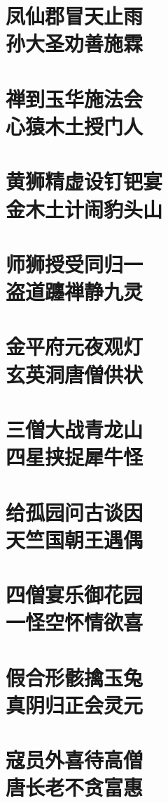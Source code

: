 \documentclass[a4paper,12pt,UTF8,twoside]{ctexbook}
\begin{document}
\chapter[凤仙郡冒天止雨\ 孙大圣劝善施霖]{凤仙郡冒天止雨\\孙大圣劝善施霖}
\chapter[禅到玉华施法会\ 心猿木土授门人]{禅到玉华施法会\\心猿木土授门人}
\chapter[黄狮精虚设钉钯宴\ 金木土计闹豹头山]{黄狮精虚设钉钯宴\\金木土计闹豹头山}
\chapter[师狮授受同归一\ 盗道躔禅静九灵]{师狮授受同归一\\盗道躔禅静九灵}
\chapter[金平府元夜观灯\ 玄英洞唐僧供状]{金平府元夜观灯\\玄英洞唐僧供状}
\chapter[三僧大战青龙山\ 四星挟捉犀牛怪]{三僧大战青龙山\\四星挟捉犀牛怪}
\chapter[给孤园问古谈因\ 天竺国朝王遇偶]{给孤园问古谈因\\天竺国朝王遇偶}
\chapter[四僧宴乐御花园\ 一怪空怀情欲喜]{四僧宴乐御花园\\一怪空怀情欲喜}
\chapter[假合形骸擒玉兔\ 真阴归正会灵元]{假合形骸擒玉兔\\真阴归正会灵元}
\chapter[寇员外喜待高僧\ 唐长老不贪富惠]{寇员外喜待高僧\\唐长老不贪富惠}
\end{document}
